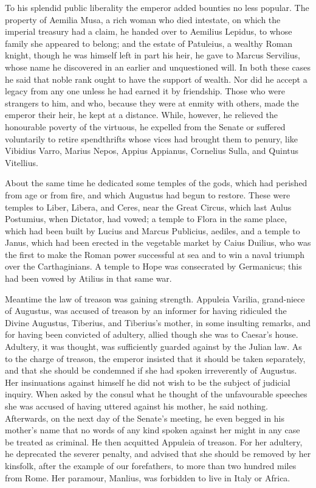 
To his splendid public liberality the emperor added bounties no less popular. The property of Aemilia Musa, a rich woman who died intestate, on which the imperial treasury had a claim, he handed over to Aemilius Lepidus, to whose family she appeared to belong; and the estate of Patuleius, a wealthy Roman knight, though he was himself left in part his heir, he gave to Marcus Servilius, whose name he discovered in an earlier and unquestioned will. In both these cases he said that noble rank ought to have the support of wealth. Nor did he accept a legacy from any one unless he had earned it by friendship. Those who were strangers to him, and who, because they were at enmity with others, made the emperor their heir, he kept at a distance. While, however, he relieved the honourable poverty of the virtuous, he expelled from the Senate or suffered voluntarily to retire spendthrifts whose vices had brought them to penury, like Vibidius Varro, Marius Nepos, Appius Appianus, Cornelius Sulla, and Quintus Vitellius.


About the same time he dedicated some temples of the gods, which had perished from age or from fire, and which Augustus had begun to restore. These were temples to Liber, Libera, and Ceres, near the Great Circus, which last Aulus Postumius, when Dictator, had vowed; a temple to Flora in the same place, which had been built by Lucius and Marcus Publicius, aediles, and a temple to Janus, which had been erected in the vegetable market by Caius Duilius, who was the first to make the Roman power successful at sea and to win a naval triumph over the Carthaginians. A temple to Hope was consecrated by Germanicus; this had been vowed by Atilius in that same war.


Meantime the law of treason was gaining strength. Appuleia Varilia, grand-niece of Augustus, was accused of treason by an informer for having ridiculed the Divine Augustus, Tiberius, and Tiberius's mother, in some insulting remarks, and for having been convicted of adultery, allied though she was to Caesar's house. Adultery, it was thought, was sufficiently guarded against by the Julian law. As to the charge of treason, the emperor insisted that it should be taken separately, and that she should be condemned if she had spoken irreverently of Augustus. Her insinuations against himself he did not wish to be the subject of judicial inquiry. When asked by the consul what he thought of the unfavourable speeches she was accused of having uttered against his mother, he said nothing. Afterwards, on the next day of the Senate's meeting, he even begged in his mother's name that no words of any kind spoken against her might in any case be treated as criminal. He then acquitted Appuleia of treason. For her adultery, he deprecated the severer penalty, and advised that she should be removed by her kinsfolk, after the example of our forefathers, to more than two hundred miles from Rome. Her paramour, Manlius, was forbidden to live in Italy or Africa.

